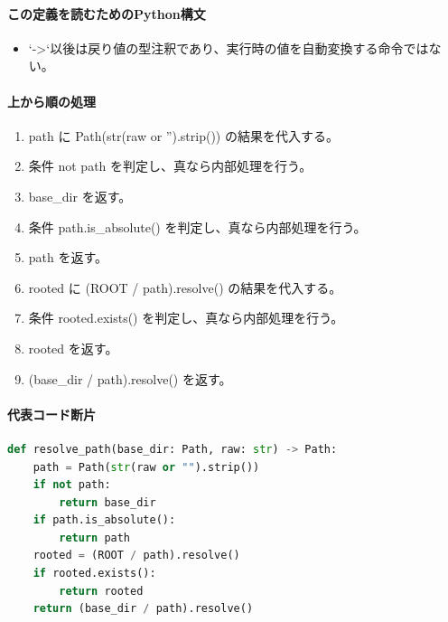 \documentclass[a4paper,11pt]{article}
\begin{document}
            \paragraph{この定義を読むためのPython構文}
            \begin{itemize}[leftmargin=1.6em]
            \item `->`以後は戻り値の型注釈であり、実行時の値を自動変換する命令ではない。
            \end{itemize}
            \paragraph{上から順の処理}
            \begin{enumerate}[leftmargin=1.8em]
            \item path に Path(str(raw or '').strip()) の結果を代入する。
\item 条件 not path を判定し、真なら内部処理を行う。
\item   base\_dir を返す。
\item 条件 path.is\_absolute() を判定し、真なら内部処理を行う。
\item   path を返す。
\item rooted に (ROOT / path).resolve() の結果を代入する。
\item 条件 rooted.exists() を判定し、真なら内部処理を行う。
\item   rooted を返す。
\item (base\_dir / path).resolve() を返す。
            \end{enumerate}
            \paragraph{代表コード断片}
            \begin{lstlisting}[language=Python]
def resolve_path(base_dir: Path, raw: str) -> Path:
    path = Path(str(raw or "").strip())
    if not path:
        return base_dir
    if path.is_absolute():
        return path
    rooted = (ROOT / path).resolve()
    if rooted.exists():
        return rooted
    return (base_dir / path).resolve()
\end{lstlisting}
\end{document}
